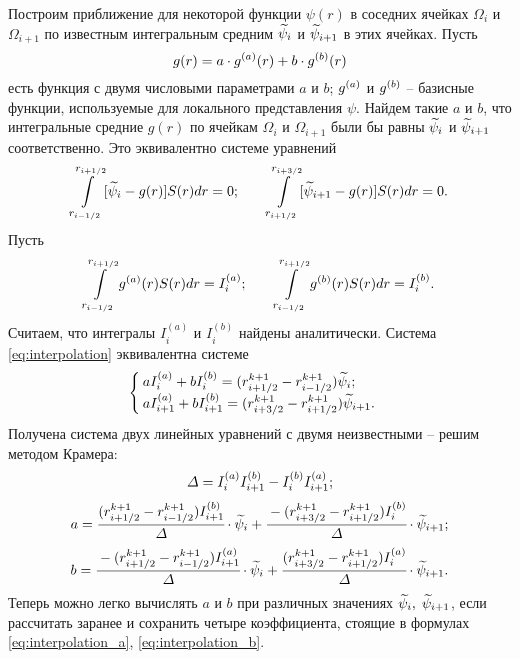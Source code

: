 Построим приближение для некоторой функции $\psi(r)$ в соседних ячейках $\Omega_i$ и $\Omega_{i + 1}$ по известным интегральным средним ${\widetilde{\psi}}_i$ и ${\widetilde{\psi}}_{i + 1}$ в этих ячейках. Пусть
$$g(r) = a \cdot {g^{(a)}}(r) + b \cdot {g^{(b)}} (r)$$
есть функция с двумя числовыми параметрами $a$ и $b$; ${g^{(a)}}$ и ${g^{(b)}}$ -- базисные функции, используемые для локального представления $\psi$. Найдем такие $a$ и $b$, что интегральные средние $g(r)$ по ячейкам $\Omega_i$ и $\Omega_{i + 1}$ были бы равны ${\widetilde{\psi}}_i$ и ${\widetilde{\psi}}_{i + 1}$ соответственно. Это эквивалентно системе уравнений
\begin{equation}
	\int\limits_{r_{i - 1/2}}^{r_{i + 1/2}} [{\widetilde{\psi}}_i - g(r)] S(r) dr = 0 {\text{;}} \qquad \int\limits_{r_{i + 1/2}}^{r_{i + 3/2}} [{\widetilde{\psi}}_{i + 1} - g(r)] S(r) dr = 0 {\text{.}}
	\label{eq:interpolation}
\end{equation}
Пусть
$$\int\limits_{r_{i - 1/2}}^{r_{i + 1/2}} {g^{(a)}}(r) S(r) dr = I_i^{(a)}; \qquad \int\limits_{r_{i - 1/2}}^{r_{i + 1/2}} {g^{(b)}}(r) S(r) dr = I_i^{(b)} {\text{.}}$$
Считаем, что интегралы $I_i^{(a)}$ и $I_i^{(b)}$ найдены аналитически. Система \eqref{eq:interpolation} эквивалентна системе
$$\begin{cases}
	a I_i^{(a)} + b I_i^{(b)} = (r_{i + 1/2}^{k + 1} - r_{i - 1/2}^{k + 1}) {\widetilde{\psi}}_i {\text{;}} \\
	a I_{i + 1}^{(a)} + b I_{i + 1}^{(b)} = (r_{i + 3/2}^{k + 1} - r_{i + 1/2}^{k + 1}) {\widetilde{\psi}}_{i + 1} {\text{.}}
\end{cases}$$
Получена система двух линейных уравнений с двумя неизвестными -- решим методом Крамера:
$$\varDelta = I_i^{(a)} I_{i + 1}^{(b)} - I_i^{(b)} I_{i + 1}^{(a)} {\text{;}}$$
\begin{equation}
	a = \cfrac{(r_{i + 1/2}^{k + 1} - r_{i - 1/2}^{k + 1}) I_{i + 1}^{(b)}}{\varDelta} \cdot {\widetilde{\psi}}_i + \cfrac{-(r_{i + 3/2}^{k + 1} - r_{i + 1/2}^{k + 1}) I_i^{(b)}}{\varDelta} \cdot {\widetilde{\psi}}_{i + 1} {\text{;}}
	\label{eq:interpolation_a}
\end{equation}
\begin{equation}
	b = \cfrac{-(r_{i + 1/2}^{k + 1} - r_{i - 1/2}^{k + 1}) I_{i + 1}^{(a)}}{\varDelta} \cdot {\widetilde{\psi}}_i + \cfrac{(r_{i + 3/2}^{k + 1} - r_{i + 1/2}^{k + 1}) I_i^{(a)}}{\varDelta} \cdot {\widetilde{\psi}}_{i + 1} {\text{.}}
	\label{eq:interpolation_b}
\end{equation}
Теперь можно легко вычислять $a$ и $b$ при различных значениях ${\widetilde{\psi}}_i, \; {\widetilde{\psi}}_{i + 1}$, если рассчитать заранее и сохранить четыре коэффициента, стоящие в формулах \eqref{eq:interpolation_a}, \eqref{eq:interpolation_b}. 

